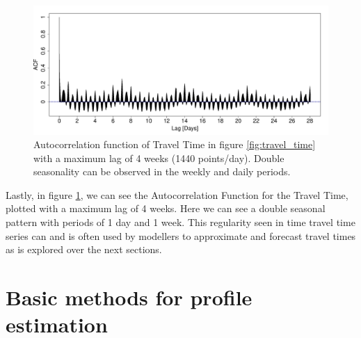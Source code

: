 \documentclass[a4paper, 10pt, conference]{ieeeconf}      %
\begin{document}
\begin{figure}[htbp]
	\centerline{\includegraphics[width=\linewidth]{./images/ACF_M6_Link3.pdf}}
	\caption{Autocorrelation function of Travel Time in figure \ref{fig:travel_time} with a maximum lag of 4 weeks (1440 points/day). Double seasonality can be observed in the weekly and daily periods.}
	\label{fig:ACF}
\end{figure}
Lastly, in figure \ref{fig:ACF}, we can see the Autocorrelation Function for the Travel Time, plotted with a maximum lag of 4 weeks. Here we can see a double seasonal pattern with periods of 1 day and 1 week.
This regularity seen in time travel time series can and is often used by modellers to approximate and forecast travel times as is explored over the next sections.
\section{Basic methods for profile estimation}\label{Basic methods for profile estimation}
\end{document}
